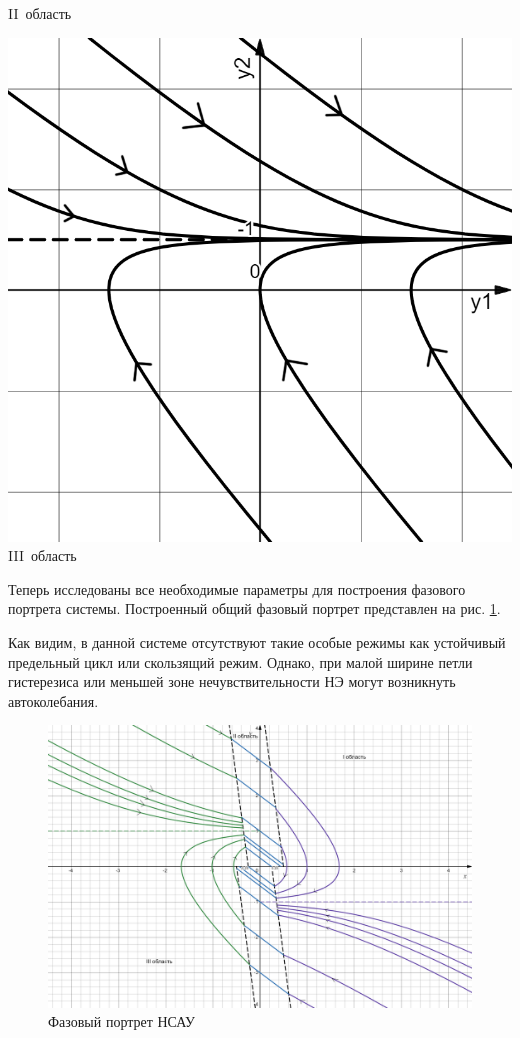 {\begin{minipage}{.333\textwidth}
		II~область
	\end{minipage}	
	\begin{minipage}{.333\textwidth}
		\centering\includegraphics[width=.95\textwidth]{png/зона3.png}
		III~область
	\end{minipage}

	\label{tr}
}

	Теперь исследованы все необходимые параметры для построения фазового портрета системы. Построенный общий фазовый портрет представлен на рис. \ref{FP}. 
	
	Как видим, в данной системе отсутствуют такие особые режимы как устойчивый предельный цикл или скользящий режим. Однако, при малой ширине петли гистерезиса или меньшей зоне нечувствительности НЭ могут возникнуть автоколебания.	
	
	\begin{figure}[h]
		\centering\includegraphics[width=.8\textwidth]{png/FP.png}
		\caption{Фазовый портрет НСАУ}
		\label{FP}
	\end{figure}

